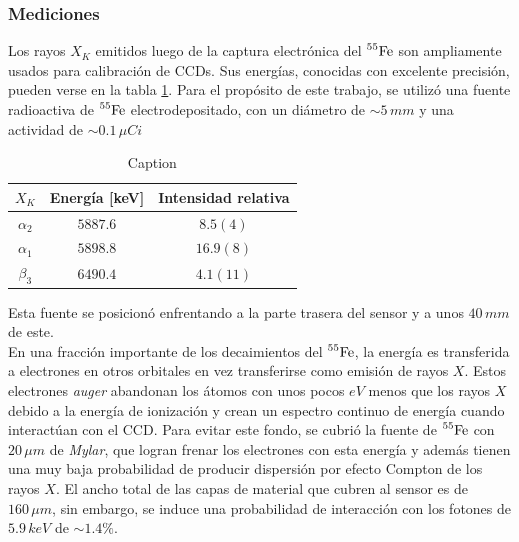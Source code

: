 {\subsubsection{Mediciones}
Los rayos $X_{K}$ emitidos luego de la captura electrónica del $\prescript{55}{}{\mbox{Fe}}$ son ampliamente usados para calibración de CCDs. Sus energías, conocidas con excelente precisión, pueden verse en la tabla \ref{tab:EnergiasXk}. Para el propósito de este trabajo, se utilizó una fuente radioactiva de $\prescript{55}{}{\mbox{Fe}}$ electrodepositado, con un diámetro de $\sim 5\,\si{mm}$ y una actividad de $\sim 0.1\,\si{\mu Ci}$
\begin{table}[h]
\centering
\begin{tabular}{@{}ccc@{}}
\toprule
$X_{K}$      & Energía [keV] & Intensidad relativa \\ \hline \hline
$\alpha_{2}$ & $5887.6$      & $8.5 (4)$           \\
$\alpha_{1}$   & $5898.8$      & $16.9 (8)$          \\
$\beta_{3}$  & $6490.4$      & $4.1 (11)$          \\ \bottomrule
\end{tabular}
\caption{\footnotesize{Caption}}
\label{tab:EnergiasXk}
\end{table}
Esta fuente se posicionó enfrentando a la parte trasera del sensor y a unos $40\,\si{mm}$ de este.\\
\indent En una fracción importante de los decaimientos del $\prescript{55}{}{\mbox{Fe}}$, la energía es transferida a electrones en otros orbitales en vez transferirse como emisión de rayos $X$. Estos electrones \textit{auger} abandonan los átomos con unos pocos $\si{eV}$ menos que los rayos $X$ debido a la energía de ionización y crean un espectro continuo de energía cuando interactúan con el CCD. Para evitar este fondo, se cubrió la fuente de $\prescript{55}{}{\mbox{Fe}}$ con $20\,\si{\mu m}$ de \textit{Mylar}, que logran frenar los electrones con esta energía y además tienen una muy baja probabilidad de producir dispersión por efecto Compton de los rayos $X$. El ancho total de las capas de material que cubren al sensor es de $160\,\si{\mu m}$, sin embargo, se induce una probabilidad de interacción con los fotones de $5.9\,\si{keV}$ de $\sim 1.4 \%$.\\
}

